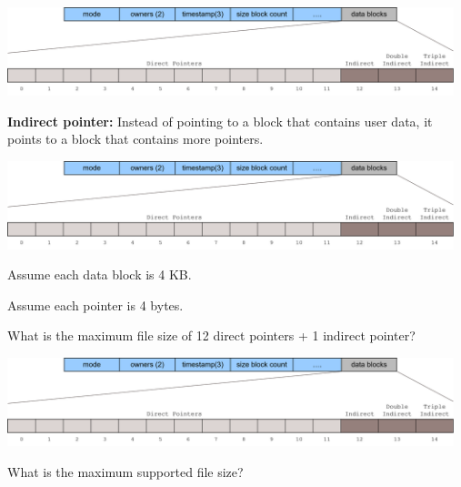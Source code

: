 \begin{slide}


    \includegraphics[width=130mm]{inode-struct-2.png}
    \bigskip

    \textbf{Indirect pointer:} Instead of pointing to a block that contains user data, it points to a block that contains more pointers.
    \bigskip

\end{slide}

\begin{slide}


    \includegraphics[width=130mm]{inode-struct-2.png}
    \bigskip

    Assume each data block is 4 KB.

    Assume each pointer is 4 bytes.
    \bigskip

    What is the maximum file size of 12 direct pointers + 1 indirect pointer?

\end{slide}

\begin{slide}


    \includegraphics[width=130mm]{inode-struct-2.png}
    \bigskip

    What is the maximum supported file size?

\end{slide}


